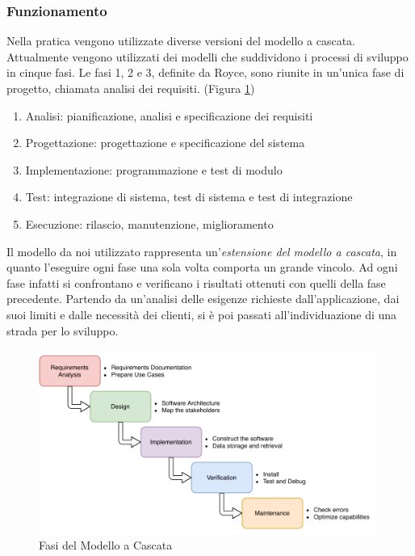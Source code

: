 \subsubsection{Funzionamento}
Nella pratica vengono utilizzate diverse versioni del modello a cascata. Attualmente vengono utilizzati dei modelli che suddividono i processi di sviluppo in cinque fasi. Le fasi 1, 2 e 3, definite da Royce, sono riunite in un’unica fase di progetto, chiamata analisi dei requisiti. (Figura \ref{fig:waterfallmodel})
\begin{enumerate}
    \item Analisi: pianificazione, analisi e specificazione dei requisiti
    \item Progettazione: progettazione e specificazione del sistema
    \item Implementazione: programmazione e test di modulo
    \item Test: integrazione di sistema, test di sistema e test di integrazione
    \item Esecuzione: rilascio, manutenzione, miglioramento
\end{enumerate}
Il modello da noi utilizzato rappresenta un'\textit{estensione del modello a cascata}, in quanto l'eseguire ogni fase una sola volta comporta un grande vincolo. Ad ogni fase infatti si confrontano e verificano i risultati ottenuti con quelli della fase precedente. Partendo da un'analisi delle esigenze richieste dall'applicazione, dai suoi limiti e dalle necessità dei clienti, si è poi passati all'individuazione di una strada per lo sviluppo.
\begin{figure}[H]
    \centering
    \includegraphics[width=0.98\textwidth]{images/02_5_waterfall_model.pdf}
    \caption{Fasi del Modello a Cascata}
    \label{fig:waterfallmodel}
\end{figure}
\newpage

